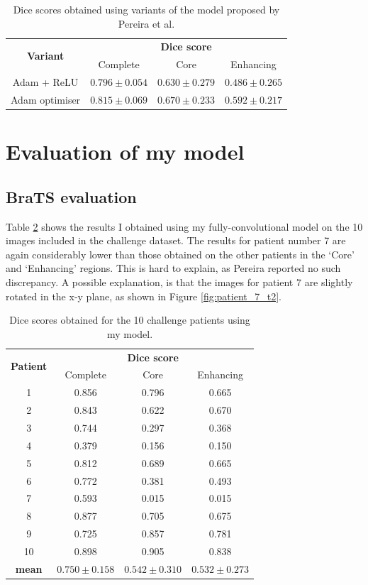 \documentclass[12pt,a4paper,twoside,openright]{report}
\begin{document}
\begin{table}
\centering	
\begin{tabular}{ c | c c c} 
\multirow{2}{*}{\textbf{Variant}} & \multicolumn{3}{c}{\textbf{Dice score}} \\
 & Complete & Core & Enhancing \\
 \hline
Adam + ReLU & $0.796 \pm 0.054$ & $0.630 \pm 0.279$ & $0.486 \pm 0.265$ \\
Adam optimiser & $0.815 \pm 0.069$ & $0.670 \pm 0.233$ & $0.592 \pm 0.217$ \\
\end{tabular}
\caption{Dice scores obtained using variants of the model proposed by Pereira et al.}
\label{table:variants_dice_results}
\end{table}


\section{Evaluation of my model}
\subsection{BraTS evaluation}
Table \ref{table:my_model_dice_results} shows the results I obtained using my fully-convolutional model on the 10 images included in the challenge dataset. The results for patient number 7 are again considerably lower than those obtained on the other patients in the `Core' and `Enhancing' regions. This is hard to explain, as Pereira reported no such discrepancy. A possible explanation, is that the images for patient 7 are slightly rotated in the x-y plane, as shown in Figure \ref{fig:patient_7_t2}.

\begin{table}
\centering	
\begin{tabular}{ c | c c c} 
\multirow{2}{*}{\textbf{Patient}} & \multicolumn{3}{c}{\textbf{Dice score}} \\
 & Complete & Core & Enhancing \\
 \hline
1 & 0.856 & 0.796 & 0.665 \\
2 & 0.843 & 0.622 & 0.670 \\
3 & 0.744 & 0.297 & 0.368 \\
4 & 0.379 & 0.156 & 0.150 \\
5 & 0.812 & 0.689 & 0.665 \\
6 & 0.772 & 0.381 & 0.493 \\
7 & 0.593 & 0.015 & 0.015 \\
8 & 0.877 & 0.705 & 0.675 \\
9 & 0.725 & 0.857 & 0.781 \\
10 & 0.898 & 0.905 & 0.838 \\
\textbf{mean} & $0.750 \pm 0.158$ & $0.542 \pm 0.310$ & $0.532 \pm 0.273$
\end{tabular}
\caption{Dice scores obtained for the 10 challenge patients using my model.}
\label{table:my_model_dice_results}
\end{table}
\end{document}
